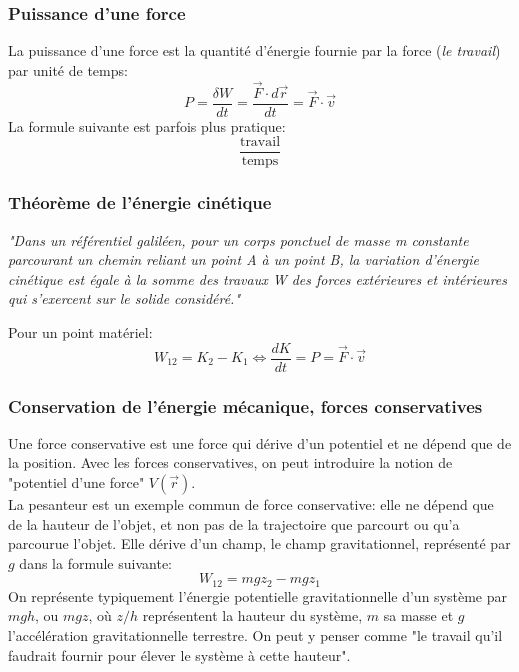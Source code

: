 \documentclass{article}
\numberwithin{equation}{section}
\begin{document}

\subsubsection{Puissance d'une force}
La puissance d'une force est la quantité d'énergie fournie par la force (\emph{le travail}) par unité de temps:
\begin{equation}
	\boxed{ P = \frac{\delta W}{dt} = \frac{\vec F \cdot d \vec r}{dt} = \vec F \cdot \vec v }
\end{equation}
La formule suivante est parfois plus pratique:
\begin{equation}
	\boxed{ \dfrac{\text{travail}}{\text{temps}} }
\end{equation}

\subsubsection{Théorème de l'énergie cinétique}
\begin{center}
	\emph{"Dans un référentiel galiléen, pour un corps ponctuel de masse m constante parcourant un chemin reliant un point A à un point B, la variation d'énergie cinétique est égale à la somme des travaux W des forces extérieures et intérieures qui s'exercent sur le solide considéré."}
\end{center}
Pour un point matériel:
\begin{equation}
	\boxed{ W_{12} = K_2 - K_1 \Leftrightarrow \frac{dK}{dt} = P = \vec F \cdot \vec v }
\end{equation}

\subsubsection{Conservation de l'énergie mécanique, forces conservatives}
Une force conservative est une force qui dérive d'un potentiel et ne dépend que de la position. Avec les forces conservatives, on peut introduire la notion de "potentiel d'une force" \(V(\vec r)\). \\

La pesanteur est un exemple commun de force conservative: elle ne dépend que de la hauteur de l'objet, et non pas de la trajectoire que parcourt ou qu'a parcourue l'objet. Elle dérive d'un champ, le champ gravitationnel, représenté par \(g\) dans la formule suivante:
\begin{equation}
	W_{12} = mgz_2 - mgz_1
\end{equation}
On représente typiquement l'énergie potentielle gravitationnelle d'un système par \(mgh\), ou \(mgz\), où \(z/h\) représentent la hauteur du système, \(m\) sa masse et \(g\) l'accélération gravitationnelle terrestre. On peut y penser comme "le travail qu'il faudrait fournir pour élever le système à cette hauteur". \\
\end{document}
